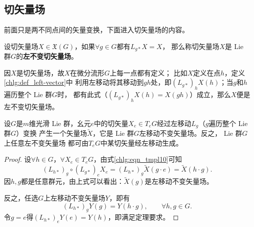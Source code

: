\subsection{切矢量场}
前面只是两不同点间的矢量变换，下面进入切矢量场的内容。
\begin{definition}\label{chlg:def_left-vector}
    设切矢量场$X\in \mathfrak{X}(G)$，如果$\forall g\in G$都有$L_{g*}X=X$，
    那么称切矢量场$X$是 Lie 群$G$的\textbf{左不变切矢量场}。
\end{definition}
因$X$是切矢量场，故$X$在微分流形$G$上每一点都有定义；
比如$X$定义在点$h$，定义\ref{chlg:def_left-vector}中
利用左移动将其移动到$gh$处，即$(L_{g*})_h X(h)$；当$g$和$h$遍历整个 Lie 群$G$时，
都有此式（$(L_{g*})_h X(h)=X(gh)$）成立，那么$X$便是左不变切矢量场。

\begin{theorem}\label{chlg:thm_lfv}
设$G$是$m$维光滑 Lie 群，幺元$e$中的切矢量$X_e\in T_eG$经过左移动$L_g$（$g$遍历整个 Lie 群$G$）变换
产生一个矢量场$\widetilde{X}$，它是 Lie 群$G$左移动不变矢量场。反之， Lie 群$G$上任意左不变矢量场
都可由$T_eG$中某切矢量经左移动生成。
\end{theorem}
\begin{proof}
    设$\forall h\in G$，$\forall X_e\in T_eG$，由式\eqref{chlg:eqn_tmpl10}可知
    \begin{equation}
       (L_{h*})_g  \circ (L_{g*})_e  X_e =
        (L_{h*})_g \widetilde{X}(g\cdot e) =\widetilde{X}(h \cdot g) .
    \end{equation}
    因$h,g$都是任意群元，由上式可以看出：$\widetilde{X}(g)$是左移动不变矢量场。

    反之，任选$G$上左移动不变矢量场${Y}$，即有
    \begin{equation}
       (L_{h*})_g {Y}(g) ={Y}(h \cdot g),\qquad \forall h,g\in G .
    \end{equation}
    令$g=e$得$(L_{h*})_e {Y}(e) ={Y}(h)$，即满足定理要求。
\end{proof}

